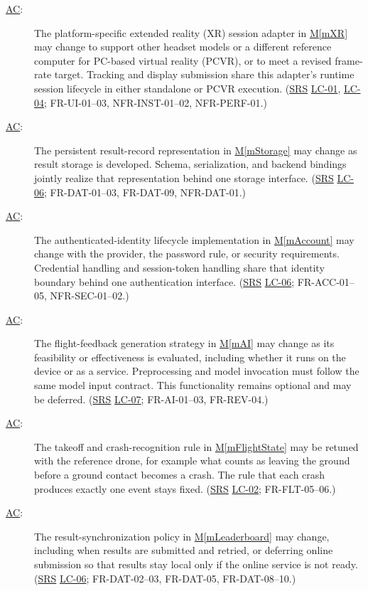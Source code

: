 \documentclass[12pt, titlepage]{article}
\DeclareRobustCommand{\mgabbr}[2]{\hyperlink{mg-abbr:#1}{#2}}
\newcounter{acnum}
\newcommand{\actheacnum}{\mgabbr{ac}{AC}\theacnum}
\newcommand{\mref}[1]{\hyperref[#1]{M\ref*{#1}}}
\begin{document}
\begin{description}
\item[ \actheacnum \label{acVR}:]
The platform-specific extended reality (XR) session adapter in \mref{mXR} may
change
to support other headset models or a different reference computer for PC-based
virtual reality (PCVR),
or to meet a revised frame-rate target. Tracking and display submission
share this adapter's runtime session lifecycle in either standalone or
PCVR execution.
(\mgabbr{srs}{SRS} \mgabbr{lc}{LC-01}, \mgabbr{lc}{LC-04}; FR-UI-01--03,
NFR-INST-01--02, NFR-PERF-01.)

\item[ \actheacnum \label{acStorage}:]
The persistent result-record representation in \mref{mStorage} may
change as result storage is developed. Schema, serialization, and backend
bindings jointly realize that representation behind one storage interface.
(\mgabbr{srs}{SRS} \mgabbr{lc}{LC-06}; FR-DAT-01--03, FR-DAT-09, NFR-DAT-01.)

\item[ \actheacnum \label{acAuthentication}:]
The authenticated-identity lifecycle implementation in \mref{mAccount}
may change with the provider, the password rule, or security requirements.
Credential handling and session-token handling share that identity boundary
behind one authentication interface.
(\mgabbr{srs}{SRS} \mgabbr{lc}{LC-06}; FR-ACC-01--05, NFR-SEC-01--02.)

\item[ \actheacnum \label{acAI}:]
The flight-feedback generation strategy in \mref{mAI} may change as
its feasibility or effectiveness is evaluated, including whether it runs on
the device or as a service. Preprocessing and model invocation must follow
the same model input contract. This functionality remains optional and may
be deferred.
(\mgabbr{srs}{SRS} \mgabbr{lc}{LC-07}; FR-AI-01--03, FR-REV-04.)

\item[ \actheacnum \label{acCrash}:]
The takeoff and crash-recognition rule in \mref{mFlightState} may be
retuned with the reference drone, for example what counts as leaving the
ground before a ground contact becomes a crash. The rule that each crash
produces exactly one event stays fixed.
(\mgabbr{srs}{SRS} \mgabbr{lc}{LC-02}; FR-FLT-05--06.)

\item[ \actheacnum \label{acSync}:]
The result-synchronization policy in \mref{mLeaderboard} may change,
including when results are submitted and retried, or deferring online
submission so that results stay local only if the online service is not
ready.
(\mgabbr{srs}{SRS} \mgabbr{lc}{LC-06}; FR-DAT-02--03, FR-DAT-05, FR-DAT-08--10.)

\end{description}
\end{document}
